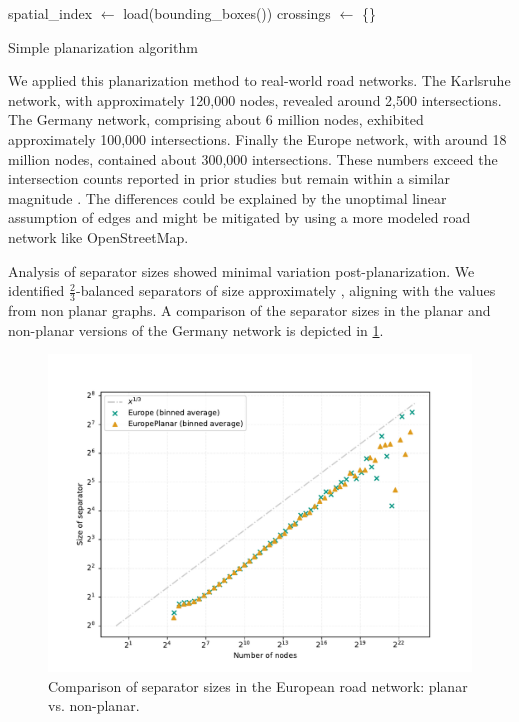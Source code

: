 \begin{algorithm}[b]
	\BlankLine
	spatial\_index \(\longleftarrow\) load(bounding\_boxes(\E))\;
	crossings \(\longleftarrow\) \{\}\;
	\caption{Simple planarization algorithm \label{alg:planarization}}
\end{algorithm}

We applied this planarization method to real-world road networks.
The Karlsruhe network, with approximately 120,000 nodes, revealed around 2,500 intersections.
The Germany network, comprising about 6 million nodes, exhibited approximately 100,000 intersections.
Finally the Europe network, with around 18 million nodes, contained about 300,000 intersections.
These numbers exceed the  intersection counts reported
in prior studies but remain within a similar magnitude
\cite{eppstein_studying_2008}. The differences could be explained by the
unoptimal linear assumption of edges and might be mitigated by using a more
modeled road network like OpenStreetMap.

Analysis of separator sizes showed minimal variation post-planarization. We
identified \(\frac{2}{3}\)-balanced separators of size approximately
, aligning with the values from non planar graphs. A comparison of
the separator sizes in the planar and non-planar versions of the Germany
network is depicted in \cref{fig:germany_planar_vs_non_planar}.

\begin{figure}
	\centering
	\includegraphics[width=0.8\linewidth]{graphics/EuropePlanarVsNonPlanar.pdf}
	\caption{Comparison of separator sizes in the European road network: planar vs. non-planar.}
	\label{fig:germany_planar_vs_non_planar}
\end{figure}

